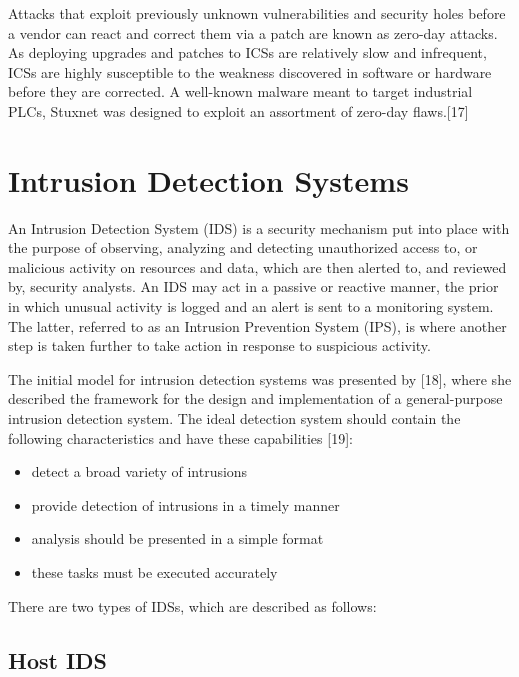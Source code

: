 \documentclass[11pt,]{article}
\begin{document}
Attacks that exploit previously unknown vulnerabilities and security
holes before a vendor can react and correct them via a patch are known
as zero-day attacks. As deploying upgrades and patches to ICSs are
relatively slow and infrequent, ICSs are highly susceptible to the
weakness discovered in software or hardware before they are corrected. A
well-known malware meant to target industrial PLCs, Stuxnet was designed
to exploit an assortment of zero-day flaws.{[}17{]}

\newpage

\section{Intrusion Detection Systems}\label{intrusion-detection-systems}

An Intrusion Detection System (IDS) is a security mechanism put into
place with the purpose of observing, analyzing and detecting
unauthorized access to, or malicious activity on resources and data,
which are then alerted to, and reviewed by, security analysts. An IDS
may act in a passive or reactive manner, the prior in which unusual
activity is logged and an alert is sent to a monitoring system. The
latter, referred to as an Intrusion Prevention System (IPS), is where
another step is taken further to take action in response to suspicious
activity.

The initial model for intrusion detection systems was presented by
{[}18{]}, where she described the framework for the design and
implementation of a general-purpose intrusion detection system. The
ideal detection system should contain the following characteristics and
have these capabilities {[}19{]}:

\begin{itemize}
\itemsep1pt\parskip0pt
\item
  detect a broad variety of intrusions
\item
  provide detection of intrusions in a timely manner
\item
  analysis should be presented in a simple format
\item
  these tasks must be executed accurately
\end{itemize}

There are two types of IDSs, which are described as follows:

\subsection{Host IDS}\label{host-ids}
\end{document}
